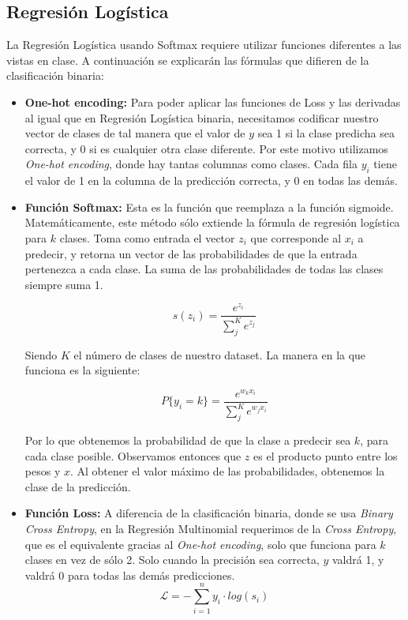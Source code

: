 \documentclass[conference]{IEEEtran}
\begin{document}
\subsection{Regresión Logística}
La Regresión Logística usando Softmax requiere utilizar funciones diferentes a las vistas en clase. A continuación se explicarán las fórmulas que difieren de la clasificación binaria:
\begin{itemize}
\item \textbf{One-hot encoding:}
Para poder aplicar las funciones de Loss y las derivadas al igual que en Regresión Logística binaria, necesitamos codificar nuestro vector de clases de tal manera que el valor de $y$ sea 1 si la clase predicha sea correcta, y 0 si es cualquier otra clase diferente. Por este motivo utilizamos \textit{One-hot encoding}, donde hay tantas columnas como clases. Cada fila $y_i$ tiene el valor de 1 en la columna de la predicción correcta, y 0 en todas las demás.

\item \textbf{Función Softmax:}
Esta es la función que reemplaza a la función sigmoide. Matemáticamente, este método sólo extiende la fórmula de regresión logística para $k$ clases. Toma como entrada el vector $z_i$ que corresponde al $x_i$ a predecir, y retorna un vector de las probabilidades de que la entrada pertenezca a cada clase. La suma de las probabilidades de todas las clases siempre suma 1.

\[s(z_i) = \frac{e^{z_i}}{\sum_j^K e^{z_j}}\]

Siendo $K$ el número de clases de nuestro dataset.
La manera en la que funciona es la siguiente:

\[P\{y_i=k\} = \frac{e^{w_kx_i}}{\sum_j^K e^{w_jx_i}}\]

Por lo que obtenemos la probabilidad de que la clase a predecir sea $k$, para cada clase posible. Observamos entonces que $z$ es el producto punto entre los pesos y $x$. Al obtener el valor máximo de las probabilidades, obtenemos la clase de la predicción.
\vspace{0.5cm}
\item \textbf{Función Loss:}
A diferencia de la clasificación binaria, donde se usa \textit{Binary Cross Entropy}, en la Regresión Multinomial requerimos de la \textit{Cross Entropy}, que es el equivalente gracias al \textit{One-hot encoding}, solo que funciona para $k$ clases en vez de sólo 2. Solo cuando la precisión sea correcta, $y$ valdrá 1, y valdrá 0 para todas las demás predicciones.
\[\mathcal{L} = -\sum_{i=1}^{n}y_i \cdot log(s_i)\]


\end{itemize}
\end{document}
